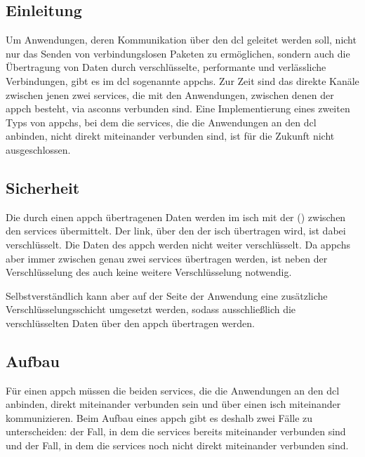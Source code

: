 \label{dcl-appch}
\subsection{Einleitung}
Um Anwendungen, deren Kommunikation über den \gls{dcl} geleitet werden soll,
nicht nur das Senden von verbindungslosen Paketen zu ermöglichen, sondern auch
die Übertragung von Daten durch verschlüsselte, performante und verlässliche
Verbindungen, gibt es im \gls{dcl} sogenannte \glspl{appch}.
Zur Zeit sind das direkte Kanäle zwischen jenen zwei \glspl{service}, die mit
den Anwendungen, zwischen denen der \gls{appch} besteht, via \glspl{asconn}
verbunden sind.
Eine Implementierung eines zweiten Typs von \glspl{appch}, bei dem die
\glspl{service}, die die Anwendungen an den \gls{dcl} anbinden, nicht direkt
miteinander verbunden sind, ist für die Zukunft nicht ausgeschlossen.

\subsection{Sicherheit}
Die durch einen \gls{appch} übertragenen Daten werden im \gls{isch} mit der
\msg{\isprotoacd} () zwischen den \glspl{service}
übermittelt.
Der \gls{link}, über den der \gls{isch} übertragen wird, ist dabei
verschlüsselt.
Die Daten des \gls{appch} werden nicht weiter verschlüsselt.
Da \glspl{appch} aber immer zwischen genau zwei \glspl{service} übertragen
werden, ist neben der Verschlüsselung des  auch keine
weitere Verschlüsselung notwendig.

Selbstverständlich kann aber auf der Seite der Anwendung eine zusätzliche
Verschlüsselungsschicht umgesetzt werden, sodass ausschließlich die
verschlüsselten Daten über den \gls{appch} übertragen werden.

\subsection{Aufbau}
Für einen \gls{appch} müssen die beiden \glspl{service}, die die Anwendungen an
den \gls{dcl} anbinden, direkt miteinander verbunden sein und über einen
\gls{isch} miteinander kommunizieren.
Beim Aufbau eines \gls{appch} gibt es deshalb zwei Fälle zu unterscheiden:
der Fall, in dem die \glspl{service} bereits miteinander verbunden sind und der
Fall, in dem die \glspl{service} noch nicht direkt miteinander verbunden sind.

